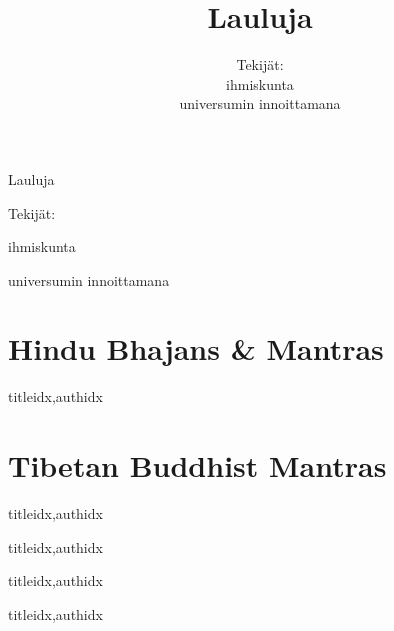 \documentclass[twoside,10pt,finnish]{book}
\title{Lauluja}
\author{Tekijät: \\
        ihmiskunta \\
        universumin innoittamana}
\begin{document}
  \begin{titlepage}
    
    \thispagestyle{empty}
    \vspace*{\fill}    
    \centerline{\Huge Lauluja}
    \vspace{3em}
    \centerline{Tekijät:}
    \centerline{ihmiskunta}
    \centerline{universumin innoittamana}
    \vspace*{\fill}
  \end{titlepage}
  
  \tableofcontents %

  \clearpage\scleardpage
    \section{Hindu Bhajans \& Mantras} 
      \begin{songs}{titleidx,authidx}
        \setcounter{songnum}{100}
        
      \end{songs}
     \scleardpage
    \section{Tibetan Buddhist Mantras}
      \begin{songs}{titleidx,authidx}
        \setcounter{songnum}{170}
        
      \end{songs}  
  
  \clearpage\scleardpage
    \begin{songs}{titleidx,authidx}
      \setcounter{songnum}{200}
      
    \end{songs}
    
  \clearpage\scleardpage    
    \begin{songs}{titleidx,authidx}
      \setcounter{songnum}{300}
      
    \end{songs}
  
  \clearpage\scleardpage
    \begin{songs}{titleidx,authidx}
      \setcounter{songnum}{400}
      
    \end{songs}
    
\end{document}
